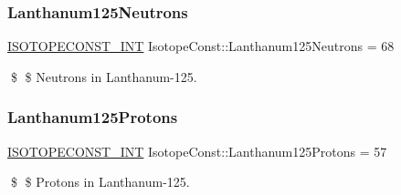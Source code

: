 \subsubsection{\texorpdfstring{Lanthanum125\+Neutrons}{Lanthanum125Neutrons}}
{\footnotesize\ttfamily \mbox{\hyperlink{group___isotope_const-_macros_ga5f18360b3e99483a35c32d789e62621c}{I\+S\+O\+T\+O\+P\+E\+C\+O\+N\+S\+T\+\_\+\+I\+NT}} Isotope\+Const\+::\+Lanthanum125\+Neutrons = 68}

\$ \$ Neutrons in Lanthanum-\/125. \mbox{\label{group___isotope_const-_lanthanum-_la125_gaab6c719d5c6f11b38b64bc83c6f62087}} 
\subsubsection{\texorpdfstring{Lanthanum125\+Protons}{Lanthanum125Protons}}
{\footnotesize\ttfamily \mbox{\hyperlink{group___isotope_const-_macros_ga5f18360b3e99483a35c32d789e62621c}{I\+S\+O\+T\+O\+P\+E\+C\+O\+N\+S\+T\+\_\+\+I\+NT}} Isotope\+Const\+::\+Lanthanum125\+Protons = 57}

\$ \$ Protons in Lanthanum-\/125. 